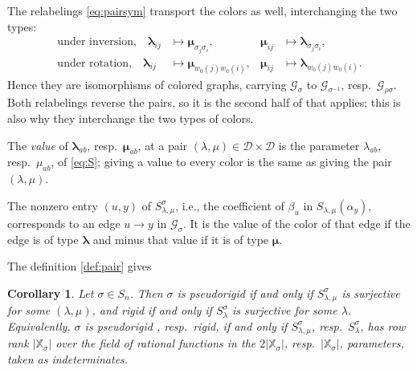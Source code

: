 \documentclass[12pt]{article}
\def\xspace{ }%
\newtheorem{corollary}[corollary]{Corollary}
\theoremstyle{definition}
\newcommand{\prig}{pseudorigid\xspace}
\newcommand{\alg}{\mathcal{A}}   %
\newcommand{\bmdl}{\mathcal{D}}   %
\newcommand{\XX}{\mathbb{X}}  %
\newcommand{\algbss}{\alpha}     %
\newcommand{\bmdlbss}{\beta}    %
\newcommand{\Sop}{S}
\newcommand{\wo}{w_0}                 %
\newcommand{\rc}{\rho}                %
\newcommand{\Gc}{\mathcal{G}}          %
\newcommand{\blam}{\boldsymbol{\lambda}}   %
\newcommand{\bmu}{\boldsymbol{\mu}}        %
\begin{document}
The relabelings \eqref{eq:pairsym} transport the colors as well, interchanging the two types:
\begin{equation}\label{eq:colorsym}
\begin{aligned}
   \text{under inversion,} \quad \blam_{ij} &\mapsto \bmu_{\sigma_j\sigma_i},
   & \bmu_{ij} &\mapsto \blam_{\sigma_j\sigma_i},\\
   \text{under rotation,} \quad \blam_{ij} &\mapsto \bmu_{\wo(j)\wo(i)},
   & \bmu_{ij} &\mapsto \blam_{\wo(j)\wo(i)} .
\end{aligned}
\end{equation}
Hence they are isomorphisms of colored graphs, carrying $\Gc_\sigma$ to
$\Gc_{\sigma^{-1}}$, resp.\ $\Gc_{\rc\sigma}$. Both relabelings reverse the
pairs, so it is the second half of  that applies; this is
also why they interchange the two types of colors.


The \emph{value} of $\blam_{ab}$, resp.\ $\bmu_{ab}$, at a
pair $(\lambda,\mu) \in \bmdl\times\bmdl$ is the parameter $\lambda_{ab}$,
resp.\ $\mu_{ab}$, of \eqref{eq:S}; giving a value to every color is the
same as giving the pair $(\lambda,\mu)$. 


The nonzero entry $(u,y)$ of $\Sop^\sigma_{\lambda,\mu}$,
i.e., the coefficient of $\bmdlbss_u$ in $\Sop_{\lambda,\mu}(\algbss_y)$,
corresponds to an edge $u \to y$ in $\Gc_\sigma$.
It is the value of the color of that edge if the edge is of type $\blam$ and minus that value if it is of type $\bmu$.


The definition \eqref{def:pair} gives

\begin{corollary}\label{cor:psGS}
Let $\sigma \in S_n$. Then $\sigma$ is \prig if and only if
$\Sop^\sigma_{\lambda,\mu}$ is surjective for some $(\lambda,\mu)$, and rigid
if and only if $\Sop^\sigma_\lambda$ is surjective for some $\lambda$.
Equivalently, $\sigma$ is \prig, resp.\ rigid, if and only if
$\Sop^\sigma_{\lambda,\mu}$, resp.\ $\Sop^\sigma_\lambda$, has row rank
$|\XX_\sigma|$ over the field of rational functions in the $2|\XX_\sigma|$,
resp.\ $|\XX_\sigma|$, parameters, taken as indeterminates.
\end{corollary}





\end{document}
